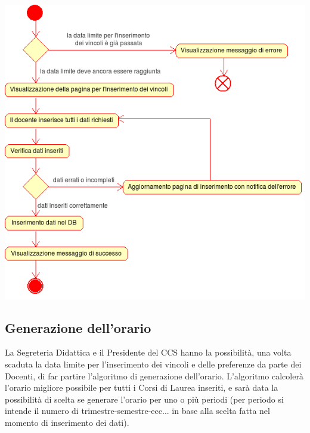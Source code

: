 \documentclass[11pt,a4paper]{article}
\begin{document}
\begin{center}
 \includegraphics[scale=0.85]{images/inserimento_vincoli.png}
\end{center}

\newpage
\subsection{Generazione dell'orario}
La Segreteria Didattica e il Presidente del CCS hanno la possibilità, una volta scaduta la data limite per l'inserimento dei vincoli e delle preferenze da parte dei Docenti, di far partire l'algoritmo di generazione dell'orario. L'algoritmo calcolerà l'orario migliore possibile per tutti i Corsi di Laurea inseriti, e sarà data la possibilità di scelta se generare l'orario per uno o più periodi (per periodo si intende il numero di trimestre-semestre-ecc... in base alla scelta fatta nel momento di inserimento dei dati).
\end{document}
